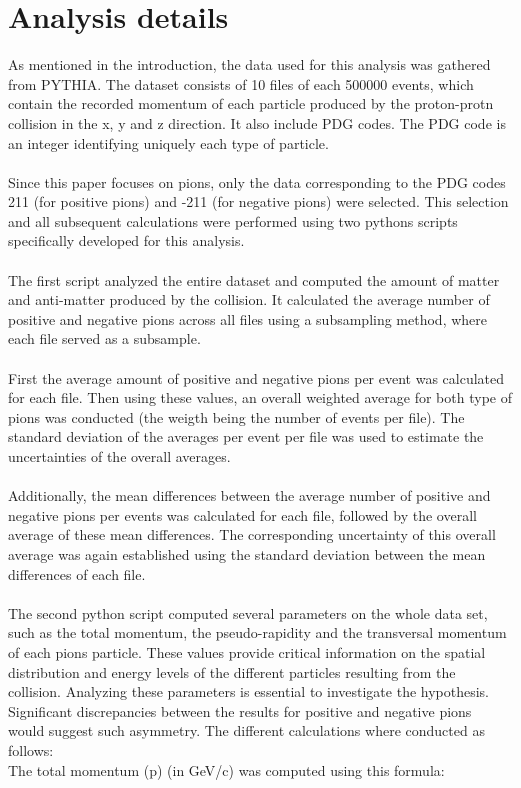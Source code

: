 \section*{Analysis details}

As mentioned in the introduction, the data used for this analysis was gathered from PYTHIA. The dataset consists of 10 files of each 500000 events, which contain the recorded momentum of each particle produced by the proton-protn collision in the x, y and z direction. It also include PDG codes. The PDG code is an integer identifying uniquely each type of particle. 
\\
\\
Since this paper focuses on pions, only the data corresponding to the PDG codes 211 (for positive pions) and -211 (for negative pions) were selected. This selection and all subsequent calculations were performed using two pythons scripts specifically developed for this analysis.  
\\
\\
The first script analyzed the entire dataset and computed the amount of matter and anti-matter produced by the collision. It calculated the average number of positive and negative pions across all files using a subsampling method, where each file served as a subsample. 
\\
\\
First the average amount of positive and negative pions per event was calculated for each file. Then using these values, an overall weighted average for both type of pions was conducted (the weigth being the number of events per file). The standard deviation of the averages per event per file was used to estimate the uncertainties of the overall averages.
\\
\\
Additionally, the mean differences between the average number of positive and negative pions per events was calculated for each file, followed by the overall average of these mean differences. The corresponding uncertainty of this overall average was again established using the standard deviation between the mean differences of each file. 
\\
\\
The second python script computed several parameters on the whole data set, such as the total momentum, the pseudo-rapidity and the transversal momentum of each pions particle. These values provide critical information on the spatial distribution and energy levels of the different particles resulting from the collision. Analyzing these parameters is essential to investigate the hypothesis. Significant discrepancies between the results for positive and negative pions would suggest such asymmetry. The different calculations where conducted as follows:
\\
The total momentum (p) (in GeV/c) was computed using this formula:

